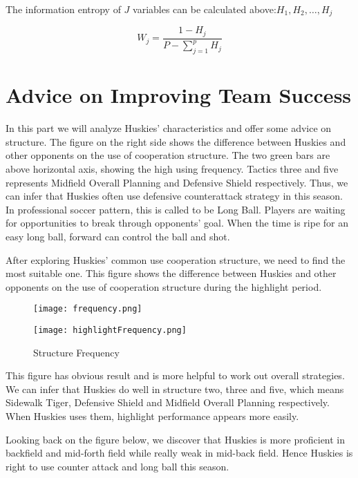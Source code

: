 \documentclass{mcmthesis}
\begin{document}
The information entropy of $J$ variables can be calculated above:$H_1,H_2, …,H_j$

\begin{equation}
        W_{j}=\frac{1-H_{j}}{P-\sum_{j=1}^{p} H_{j}}
\end{equation}

\section{Advice on Improving Team Success}
In this part we will analyze Huskies’ characteristics and offer some advice on structure.
The figure on the right side shows the difference between Huskies and other opponents on the
use of cooperation structure. The two green bars are above horizontal axis, showing the high
using frequency. Tactics three and five represents Midfield Overall Planning and Defensive
Shield respectively. Thus, we can infer that Huskies often use defensive counterattack strategy in
this season. In professional soccer pattern, this is called to be Long Ball. Players are waiting for
opportunities to break through opponents’ goal. When the time is ripe for an easy long ball,
forward can control the ball and shot.

After exploring Huskies’ common use cooperation structure, we need to find the most suitable
one. This figure shows the difference between Huskies and other opponents on the use of
cooperation structure during the highlight period.

\begin{figure}
        \centering
        \begin{minipage}[c]{0.45\textwidth}
                \centering
                \texttt{[image: frequency.png]}
        \end{minipage}
        \begin{minipage}[c]{0.45\textwidth}
                \centering
                \texttt{[image: highlightFrequency.png]}
        \end{minipage}
        \caption{Structure Frequency}
\end{figure}

This figure has obvious result and is more helpful to work out overall strategies. We can infer
that Huskies do well in structure two, three and five, which means Sidewalk Tiger, Defensive
Shield and Midfield Overall Planning respectively. When Huskies uses them, highlight
performance appears more easily.

Looking back on the figure below, we
discover that Huskies is more proficient
in backfield and mid-forth field while
really weak in mid-back field. Hence
Huskies is right to use counter attack and
long ball this season.
\end{document}
